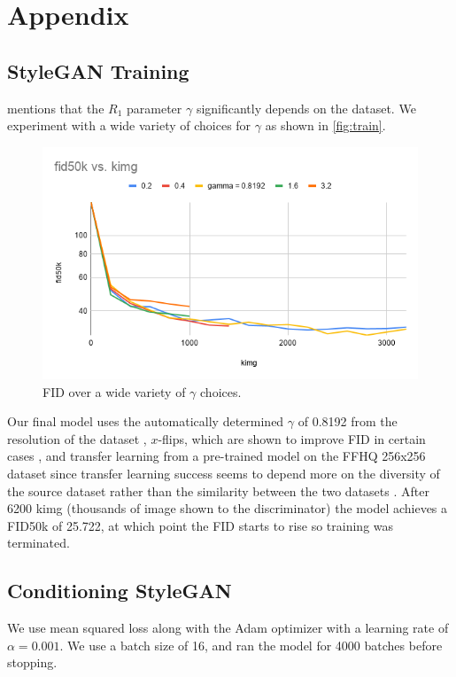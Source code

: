 \documentclass[11pt, oneside]{article}
\begin{document}
\newpage

\printbibliography

\newpage

\section{Appendix}
\subsection{StyleGAN Training} \label{app:train}
\cite{stylegan2} mentions that the \( R_1 \) parameter \( \gamma
\) significantly depends on the dataset. We experiment with a wide
variety of choices for \( \gamma \) as shown in \autoref{fig:train}.

\begin{figure}[h!]
  \centering
  \includegraphics[scale=0.7]{graph}
  \caption{FID over a wide variety of \( \gamma \) choices.}
  \label{fig:train}
\end{figure}

Our final model uses the automatically determined \( \gamma \) of 0.8192
from the resolution of the dataset \cite{stylegan2ada}, \( x \)-flips,
which are shown to improve FID in certain cases \cite{stylegan2ada}, and
transfer learning from a pre-trained model on the FFHQ 256x256 dataset
since transfer learning success seems to depend more on the diversity of
the source dataset rather than the similarity between the two datasets
\cite{stylegan2ada}. After 6200 kimg (thousands of image shown to the
discriminator) the model achieves a FID50k of 25.722, at which point the
FID starts to rise so training was terminated.

\subsection{Conditioning StyleGAN} \label{app:cond}
We use mean squared loss along with the Adam optimizer with
a learning rate of \( \alpha = 0.001 \). We use a batch size
of 16, and ran the model for 4000 batches before stopping.
\end{document}
